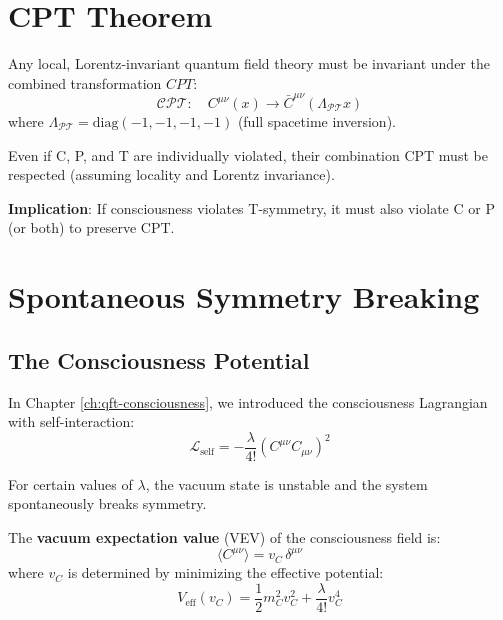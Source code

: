 \section{CPT Theorem}

\begin{theorem}\label{thm:cpt-consciousness}
Any local, Lorentz-invariant quantum field theory must be invariant under the combined transformation $CPT$:
\begin{equation}
\mathcal{C}\mathcal{P}\mathcal{T}: \quad C^{\mu\nu}(x) \to \bar{C}^{\mu\nu}(\Lambda_{\mathcal{P}\mathcal{T}} x)
\end{equation}
where $\Lambda_{\mathcal{P}\mathcal{T}} = \text{diag}(-1, -1, -1, -1)$ (full spacetime inversion).
\end{theorem}

Even if C, P, and T are individually violated, their combination CPT must be respected (assuming locality and Lorentz invariance).

\textbf{Implication}: If consciousness violates T-symmetry, it must also violate C or P (or both) to preserve CPT.

\section{Spontaneous Symmetry Breaking}

\subsection{The Consciousness Potential}

In Chapter \ref{ch:qft-consciousness}, we introduced the consciousness Lagrangian with self-interaction:
\begin{equation}
\mathcal{L}_{\text{self}} = -\frac{\lambda}{4!}\left( C^{\mu\nu}C_{\mu\nu} \right)^2
\end{equation}

For certain values of $\lambda$, the vacuum state is unstable and the system spontaneously breaks symmetry.

\begin{definition}\label{def:consciousness-vev}
The \textbf{vacuum expectation value} (VEV) of the consciousness field is:
\begin{equation}
\langle C^{\mu\nu} \rangle = v_C \, \delta^{\mu\nu}
\end{equation}
where $v_C$ is determined by minimizing the effective potential:
\begin{equation}
V_{\text{eff}}(v_C) = \frac{1}{2}m_C^2 v_C^2 + \frac{\lambda}{4!} v_C^4
\end{equation}
\end{definition}

